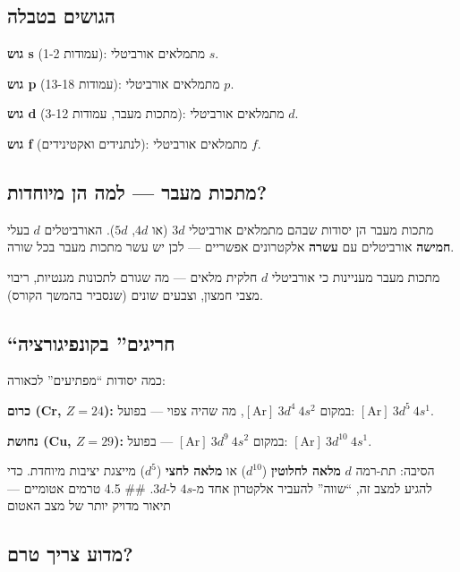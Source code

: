\documentclass[
  hebrew,
  letterpaper,
  DIV=11,
  numbers=noendperiod]{scrreprt}
\begin{document}
\subsection{הגושים
בטבלה}\label{ux5d4ux5d2ux5d5ux5e9ux5d9ux5dd-ux5d1ux5d8ux5d1ux5dcux5d4}

\textbf{גוש s} (עמודות 1-2): מתמלאים אורביטלי \(s\).

\textbf{גוש p} (עמודות 13-18): מתמלאים אורביטלי \(p\).

\textbf{גוש d} (מתכות מעבר, עמודות 3-12): מתמלאים אורביטלי \(d\).

\textbf{גוש f} (לנתנידים ואקטינידים): מתמלאים אורביטלי \(f\).

\subsection{מתכות מעבר --- למה הן
מיוחדות?}\label{ux5deux5eaux5dbux5d5ux5ea-ux5deux5e2ux5d1ux5e8-ux5dcux5deux5d4-ux5d4ux5df-ux5deux5d9ux5d5ux5d7ux5d3ux5d5ux5ea}

מתכות מעבר הן יסודות שבהם מתמלאים אורביטלי \(3d\) (או \(4d\), \(5d\)).
האורביטלים \(d\) בעלי \textbf{חמישה} אורביטלים עם \textbf{עשרה}
אלקטרונים אפשריים --- לכן יש עשר מתכות מעבר בכל שורה.

מתכות מעבר מעניינות כי אורביטלי \(d\) חלקית מלאים --- מה שגורם לתכונות
מגנטיות, ריבוי מצבי חמצון, וצבעים שונים (שנסביר בהמשך הקורס).

\subsection{``חריגים''
בקונפיגורציה}\label{ux5d7ux5e8ux5d9ux5d2ux5d9ux5dd-ux5d1ux5e7ux5d5ux5e0ux5e4ux5d9ux5d2ux5d5ux5e8ux5e6ux5d9ux5d4}

כמה יסודות ``מפתיעים'' לכאורה:

\textbf{כרום (Cr, \(Z=24\)):} במקום \([\text{Ar}]\ 3d^4\ 4s^2\), מה שהיה
צפוי --- בפועל: \([\text{Ar}]\ 3d^5\ 4s^1\).

\textbf{נחושת (Cu, \(Z=29\)):} במקום \([\text{Ar}]\ 3d^9\ 4s^2\) ---
בפועל: \([\text{Ar}]\ 3d^{10}\ 4s^1\).

הסיבה: תת-רמה \(d\) \textbf{מלאה לחלוטין} (\(d^{10}\)) או \textbf{מלאה
לחצי} (\(d^5\)) מייצגת יציבות מיוחדת. כדי להגיע למצב זה, ``שווה'' להעביר
אלקטרון אחד מ-\(4s\) ל-\(3d\). \#\# 4.5 טרמים אטומיים --- תיאור מדויק
יותר של מצב האטום

\subsection{מדוע צריך
טרם?}\label{ux5deux5d3ux5d5ux5e2-ux5e6ux5e8ux5d9ux5da-ux5d8ux5e8ux5dd}
\end{document}

